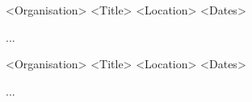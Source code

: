 


\begin{cventries}

\cventry
{<Organisation>} %
{<Title>}%
{<Location>} %
{<Dates>} %
{ %
\begin{cvitems}
\item{ ... }
\end{cvitems}
}

\cventry
{<Organisation>} %
{<Title>}%
{<Location>} %
{<Dates>} %
{ %
\begin{cvitems}
\item{ ... }
\end{cvitems}
}


\end{cventries}